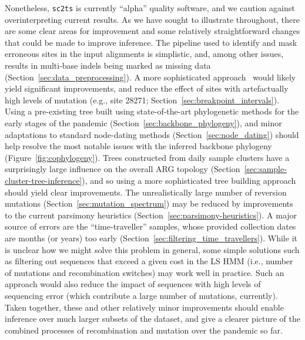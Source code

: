 \documentclass{article}
\begin{document}
Nonetheless, \texttt{sc2ts} is currently ``alpha'' quality software, and
we caution against overinterpreting current results. As we have sought
to illustrate throughout, there are some clear areas for improvement
and some relatively straightforward changes that could be made to
improve inference. The pipeline used to identify and
mask erroneous sites in the input alignments is simplistic, and, among
other issues, results in multi-base indels being marked as missing data
(Section~\ref{sec:data_preprocessing}). A more sophisticated
approach~\citep[e.g.,][]{Aksamentov2021-hj} would
likely yield significant improvements, and reduce the effect of sites with
artefactually high levels of mutation (e.g., site 28271;
Section~\ref{sec:breakpoint_intervals}).
Using a pre-existing tree built using state-of-the-art phylogenetic methods
for the early stages of the pandemic (Section~\ref{sec:backbone_phylogeny}),
and minor adaptations to standard node-dating methods
(Section~\ref{sec:node_dating}) should help resolve the most notable issues with
the inferred backbone phylogeny (Figure~\ref{fig:cophylogeny}).
Trees constructed from daily sample clusters have a surprisingly large
influence on the overall ARG topology
(Section~\ref{sec:sample-cluster-tree-inference}), and so using a more
sophisticated tree building approach should yield clear improvements.
The unrealistically large number of reversion mutations
(Section~\ref{sec:mutation_spectrum}) may be reduced by
improvements to the current parsimony
heuristics (Section~\ref{sec:parsimony-heuristics}).
A major source of errors are the ``time-traveller'' samples, whose
provided collection dates are months (or years) too early
(Section~\ref{sec:filtering_time_travellers}).
While it is unclear how
we might solve this problem in general, some simple solutions such
as filtering out sequences that exceed a given cost in the LS HMM
(i.e., number of mutations and recombination switches) may work well
in practice. Such an approach would also reduce the impact of sequences
with high levels of sequencing error (which contribute a large number of
mutations, currently).
Taken together, these and other relatively minor improvements should
enable inference over much larger subsets of the dataset, and
give a clearer picture of the combined processes of recombination and
mutation over the pandemic so far.
\end{document}
